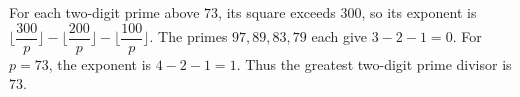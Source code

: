 For each two-digit prime above $73$, its square exceeds $300$, so its exponent is $\lfloor\dfrac{300}{p}\rfloor-\lfloor\dfrac{200}{p}\rfloor-\lfloor\dfrac{100}{p}\rfloor$. The primes $97,89,83,79$ each give $3-2-1=0$. For $p=73$, the exponent is $4-2-1=1$. Thus the greatest two-digit prime divisor is $\boxed{73}$.
